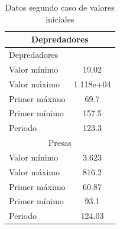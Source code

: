 \documentclass[12pt,letterpaper]{article}
\begin{document}
\begin{table}
\caption{Datos segundo caso de valores iniciales}
\label{table:ejercicio32}
\centering
\begin{tabular}{| l| c| }
\hline
  \multicolumn{2}{|c|}{Depredadores} \\
\hline
  Depredadores & \\
  Valor mínimo &19.02\\
  Valor máximo &1.118e+04\\
  Primer máximo&69.7\\
  Primer mínimo&157.5\\
  Periodo      &123.3\\
\hline
  \multicolumn{2}{|c|}{Presas} \\
\hline
  Valor mínimo &3.623\\
  Valor máximo &816.2\\
  Primer máximo&60.87\\
  Primer mínimo&93.1\\
  Periodo      &124.03\\
\hline 
\end{tabular}
\end{table}
\end{document}
